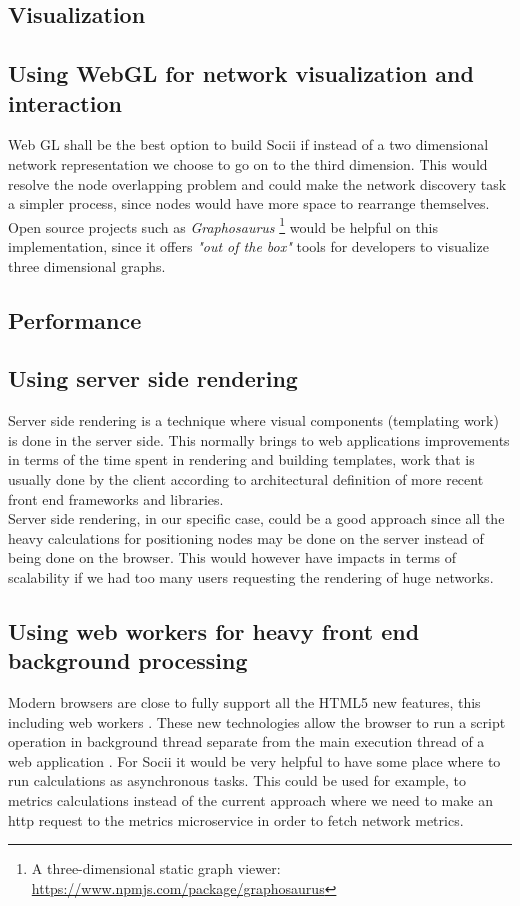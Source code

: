 \subsection{Visualization}

\subsection*{Using WebGL for network visualization and interaction}
Web GL \citep{marrin2011webgl} shall be the best option to build Socii if instead of a two dimensional network representation we choose to go on to the third dimension. This would resolve the node overlapping problem and could make the network discovery task a simpler process, since nodes would have more space to rearrange themselves. Open source projects such as \emph{Graphosaurus} \footnote{A three-dimensional static graph viewer: \url{https://www.npmjs.com/package/graphosaurus}} would be helpful on this implementation, since it offers \textit{"out of the box"} tools for developers to visualize three dimensional graphs.

\subsection{Performance}

\subsection*{Using server side rendering}
Server side rendering is a technique where visual components (templating work) is done in the server side. This normally brings to web applications improvements in terms of the time spent in rendering and building templates, work that is usually done by the client according to architectural definition of more recent front end frameworks and libraries.\\
\indent Server side rendering, in our specific case, could be a good approach since all the heavy calculations for positioning nodes
may be done on the server instead of being done on the browser. This would however have impacts in terms of scalability if we had too many users requesting the rendering of huge networks.

\subsection*{Using web workers for heavy front end background processing}
Modern browsers are close to fully support all the HTML5 new features, this including web workers \citep{webworkers}. These new technologies allow
the browser to run a script operation in background thread separate from the main execution thread of a web application \citep{mdnwebworkers}. For Socii it would be very helpful to have some place where to run calculations as asynchronous tasks. This could be used for example, to metrics calculations instead of the current approach where we need to make an http request to the metrics microservice in order to fetch network metrics.

